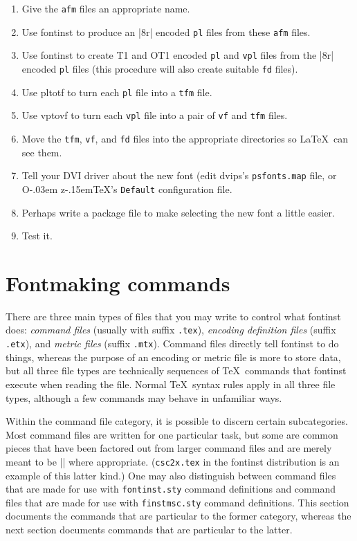 \documentclass[a4paper]{ltxguide}
\newcommand*{\OzTeX}{O\kern-.03em z\kern-.15em\TeX}
\newcommand*{\setfilename}[1]{\texttt{#1}}
\newcommand*{\setdotfilename}[1]{\setfilename{.#1}}
\newcommand*{\setpackagename}[1]{\textsf{#1}}
\newcommand{\dvips}   {\setpackagename{dvips}\xspace}
\newcommand{\fontinst}{\setpackagename{font\-inst}\xspace}
\newcommand{\vf} {\setfilename{vf}\xspace}
\newcommand{\pl} {\setfilename{pl}\xspace}
\newcommand{\fd} {\setfilename{fd}\xspace}
\newcommand{\afm}{\setfilename{afm}\xspace}
\newcommand{\vpl}{\setfilename{vpl}\xspace}
\newcommand{\tfm}{\setfilename{tfm}\xspace}
\newcommand{\vptovf}{\setpackagename{vptovf}\xspace}
\newcommand{\pltotf}{\setpackagename{pltotf}\xspace}
\begin{document}
\begin{enumerate}
\item Give the \afm files an appropriate name.
\item Use \fontinst to produce an |8r| encoded \pl files from
  these \afm files.
\item Use \fontinst to create T1 and OT1 encoded \pl and \vpl
  files from the |8r| encoded \pl files (this procedure will also
  create suitable \fd files).
\item Use \pltotf to turn each \pl file into a \tfm file.
\item Use \vptovf to turn each \vpl file into a pair of \vf and
  \tfm files.
\item Move the \tfm, \vf, and \fd files into the appropriate
  directories so \LaTeX\ can see them.
\item Tell your DVI driver about the new font (edit \dvips's
  \texttt{psfonts.map} file, or \OzTeX's \texttt{Default}
  configuration file.
\item Perhaps write a package file to make selecting the new font
  a little easier.
\item Test it.
\end{enumerate}


\section{Fontmaking commands}

There are three main types of files that you may write to control what 
\fontinst does: \emph{command files} (usually with suffix 
\setdotfilename{tex}), \emph{encoding definition files} (suffix 
\setdotfilename{etx}), and \emph{metric files} (suffix 
\setdotfilename{mtx}). Command files directly tell \fontinst to do 
things, whereas the purpose of an encoding or metric file is more to 
store data, but all three file types are technically sequences of 
\TeX\ commands that \fontinst execute when reading the file. Normal 
\TeX\ syntax rules apply in all three file types, although a few 
commands may behave in unfamiliar ways.

Within the command file category, it is possible to discern certain 
subcategories. Most command files are written for one particular 
task, but some are common pieces that have been factored out from 
larger command files and are merely meant to be || where 
appropriate. (\setfilename{csc2x.tex} in the \fontinst distribution is 
an example of this latter kind.) One may also distinguish between 
command files that are made for use with \setfilename{fontinst.sty} 
command definitions and command files that are made for use with 
\setfilename{finstmsc.sty} command definitions. This section documents 
the commands that are particular to the former category, whereas the 
next section documents commands that are particular to the latter.
\end{document}
